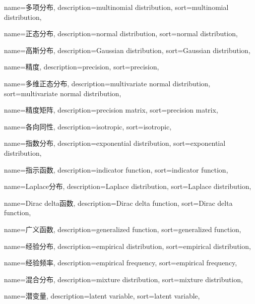 {
  name=多项分布,
  description={multinomial distribution},
  sort={multinomial distribution},
}

{
  name=正态分布,
  description={normal distribution},
  sort={normal distribution},
}

{
  name=高斯分布,
  description={Gaussian distribution},
  sort={Gaussian distribution},
}

{
  name=精度,
  description={precision},
  sort={precision},
}

{
  name=多维正态分布,
  description={multivariate normal distribution},
  sort={multivariate normal distribution},
}

{
  name=精度矩阵,
  description={precision matrix},
  sort={precision matrix},
}

{
  name=各向同性,
  description={isotropic},
  sort={isotropic},
}

{
  name=指数分布,
  description={exponential distribution},
  sort={exponential distribution},
}

{
  name=指示函数,
  description={indicator function},
  sort={indicator function},
}

{
  name=Laplace分布,
  description={Laplace distribution},
  sort={Laplace distribution},
}

{
  name=Dirac delta函数,
  description={Dirac delta function},
  sort={Dirac delta function},
}

{
  name=广义函数,
  description={generalized function},
  sort={generalized function},
}

{
  name=经验分布,
  description={empirical distribution},
  sort={empirical distribution},
}

{
  name=经验频率,
  description={empirical frequency},
  sort={empirical frequency},
}

{
  name=混合分布,
  description={mixture distribution},
  sort={mixture distribution},
}

{
  name=潜变量,
  description={latent variable},
  sort={latent variable},
}

